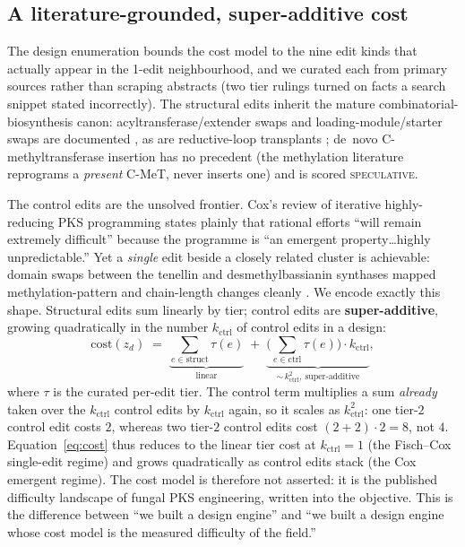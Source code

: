 \subsection{A literature-grounded, super-additive cost}\label{sec:cost}
The design enumeration bounds the cost model to the nine edit kinds that actually appear in the 1-edit
neighbourhood, and we curated each from primary sources rather than scraping abstracts (two tier rulings
turned on facts a search snippet stated incorrectly). The structural edits inherit the mature
combinatorial-biosynthesis canon: acyltransferase/extender swaps and loading-module/starter swaps are
documented \citep{atreview,science1997}, as are reductive-loop transplants \citep{reductiveloop}; de~novo
C-methyltransferase insertion has no precedent (the methylation literature reprograms a \emph{present}
C-MeT, never inserts one) and is scored \textsc{speculative}.

The control edits are the unsolved frontier. Cox's review of iterative highly-reducing PKS programming
\citep{cox2023} states plainly that rational efforts ``will remain extremely difficult'' because the
programme is ``an emergent property\ldots highly unpredictable.'' Yet a \emph{single} edit beside a
closely related cluster is achievable: domain swaps between the tenellin and desmethylbassianin synthases
mapped methylation-pattern and chain-length changes cleanly \citep{fisch2011}. We encode exactly this
shape. Structural edits sum linearly by tier; control edits are \textbf{super-additive}, growing
quadratically in the number $k_{\text{ctrl}}$ of control edits in a design:
\begin{equation}
\mathrm{cost}(z_d) \;=\; \underbrace{\textstyle\sum_{e\in\text{struct}} \tau(e)}_{\text{linear}}
\;+\; \underbrace{\Big(\textstyle\sum_{e\in\text{ctrl}} \tau(e)\Big)\cdot k_{\text{ctrl}}}_{\sim\, k_{\text{ctrl}}^2,\ \text{super-additive}},
\label{eq:cost}
\end{equation}
where $\tau$ is the curated per-edit tier. The control term multiplies a sum \emph{already} taken over
the $k_{\text{ctrl}}$ control edits by $k_{\text{ctrl}}$ again, so it scales as $k_{\text{ctrl}}^2$:
one tier-$2$ control edit costs $2$, whereas two tier-$2$ control edits cost $(2{+}2)\cdot 2 = 8$, not
$4$. Equation~\eqref{eq:cost} thus reduces to the linear tier cost at $k_{\text{ctrl}}=1$ (the
Fisch--Cox single-edit regime) and grows quadratically as control edits stack (the Cox emergent
regime). The cost model is therefore not asserted: it is the published difficulty landscape of fungal
PKS engineering, written into the objective. This is the difference between ``we built a design engine''
and ``we built a design engine whose cost model is the measured difficulty of the field.''

